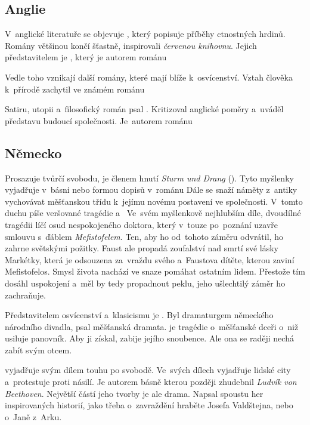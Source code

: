 \subsection*{Anglie}
V~anglické literatuře se objevuje , který
popisuje příběhy ctnostných hrdinů. Romány většinou končí šťastně,
inspirovali \emph{červenou knihovnu}. Jejich představitelem je
, který je autorem románu 

Vedle toho vznikají další romány, které mají blíže k~osvícenství.
Vztah člověka k~přírodě zachytil  ve známém
románu 

Satiru, utopii a~filosofický román psal .
Kritizoval anglické poměry a~uváděl představu budoucí společnosti.
Je~autorem románu  

\subsection*{Německo}
 Prosazuje tvůrčí svobodu, je členem
hnutí \emph{Sturm und Drang} (). Tyto myšlenky
vyjadřuje v~básni  nebo formou dopisů v~románu
 Dále se snaží náměty z~antiky
vychovávat měšťanskou třídu k~jejímu novému postavení ve společnosti.
V~tomto duchu píše veršované tragédie 
a~ Ve~svém myšlenkově nejhlubším díle, dvoudílné
tragédii  líčí osud nespokojeného doktora, který v~touze
po~poznání uzavře smlouvu s~ďáblem \emph{Mefistofelem}. Ten, aby ho
od~tohoto záměru odvrátil, ho zahrne světskými požitky. Faust ale
propadá zoufalství nad smrtí své lásky Markétky, která je odsouzena
za~vraždu svého a~Faustova dítěte, kterou zaviní Mefistofelos. Smysl
života nachází ve snaze pomáhat ostatním lidem. Přestože tím dosáhl
uspokojení a~měl by tedy propadnout peklu, jeho ušlechtilý záměr 
ho zachraňuje.  

Představitelem osvícenství a~klasicismu je . Byl
dramaturgem německého národního divadla, psal měšťanská dramata.
 je tragédie o~měšťanské dceři o~niž usiluje
panovník. Aby ji získal, zabije jejího snoubence. Ale ona se raději  nechá
zabít svým otcem.

 vyjadřuje svým dílem touhu po svobodě.
Ve~svých dílech vyjadřuje lidské city a~protestuje proti násilí.
Je autorem básně  kterou později zhudebnil
\emph{Ludvík von Beethoven}.
Největší částí jeho tvorby je ale drama. Napsal spoustu her
inspirovaných historií, jako třeba  o~zavraždění
hraběte Josefa Valdštejna,  nebo 
 o~Janě z~Arku.
